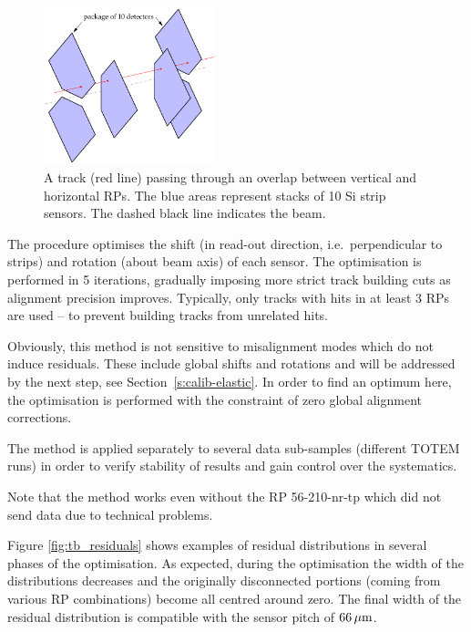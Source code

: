 \documentclass[TOTEM]{cern/cernphprep}
\def\un#1{\,{\rm #1}}
\begin{document}
\begin{figure}[h!]
\begin{center}
\includegraphics[width=5cm]{fig/rp_overlap.pdf}
\caption{%
A track (red line) passing through an overlap between vertical and horizontal RPs. The blue areas represent stacks of 10 Si strip sensors. The dashed black line indicates the beam.
}
\label{fig:rp_overlap}
\end{center}
\end{figure}

The procedure optimises the shift (in read-out direction, i.e.~perpendicular to strips) and rotation (about beam axis) of each sensor. The optimisation is performed in 5 iterations, gradually imposing more strict track building cuts as alignment precision improves. Typically, only tracks with hits in at least 3 RPs are used -- to prevent building tracks from unrelated hits.

Obviously, this method is not sensitive to misalignment modes which do not induce residuals. These include global shifts and rotations and will be addressed by the next step, see Section~\ref{s:calib-elastic}. In order to find an optimum here, the optimisation is performed with the constraint of zero global alignment corrections.

The method is applied separately to several data sub-samples (different TOTEM runs) in order to verify stability of results and gain control over the systematics.

Note that the method works even without the RP 56-210-nr-tp which did not send data due to technical problems.

Figure \ref{fig:tb_residuals} shows examples of residual distributions in several phases of the optimisation. As expected, during the optimisation the width of the distributions decreases and the originally disconnected portions (coming from various RP combinations) become all centred around zero. The final width of the residual distribution is compatible with the sensor pitch of $66\un{\mu m}$.
\end{document}
